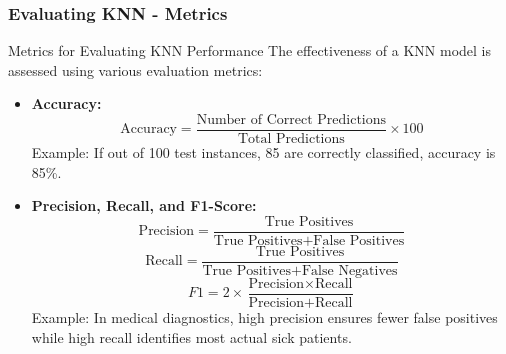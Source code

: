 \documentclass[aspectratio=169]{beamer}
\begin{document}
\begin{frame}[fragile]
  \frametitle{Evaluating KNN - Metrics}
  \begin{block}{Metrics for Evaluating KNN Performance}
    The effectiveness of a KNN model is assessed using various evaluation metrics:
    
    \begin{itemize}
      \item \textbf{Accuracy:}
        \begin{equation}
        \text{Accuracy} = \frac{\text{Number of Correct Predictions}}{\text{Total Predictions}} \times 100
        \end{equation}
        Example: If out of 100 test instances, 85 are correctly classified, accuracy is 85\%.

      \item \textbf{Precision, Recall, and F1-Score:}
        \begin{equation}
        \text{Precision} = \frac{\text{True Positives}}{\text{True Positives} + \text{False Positives}}
        \end{equation}
        \begin{equation}
        \text{Recall} = \frac{\text{True Positives}}{\text{True Positives} + \text{False Negatives}}
        \end{equation}
        \begin{equation}
        F1 = 2 \times \frac{\text{Precision} \times \text{Recall}}{\text{Precision} + \text{Recall}}
        \end{equation}
        Example: In medical diagnostics, high precision ensures fewer false positives while high recall identifies most actual sick patients.
    \end{itemize}
  \end{block}
\end{frame}
\end{document}
